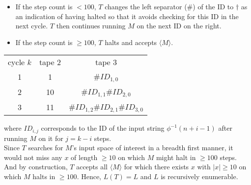 \documentclass[12pt]{article}
\begin{document}
\begin{itemize}
  \begin{itemize}
    \item If the step count is \(< 100\), \(T\) changes the left separator (\#) of the ID to \(\dagger\) as an indication of having halted so that it avoids checking for this ID in the next cycle. \(T\) then continues running \(M\) on the next ID on the right.
    \item If the step count is \(\geq 100\), \(T\) halts and accepts \(\langle M \rangle\).
  \end{itemize}
\end{itemize}

\begin{center}
  \begin{tabular}{ c c c }
  cycle \(k\) & tape 2 & tape 3 \\
  1 & 1 & \#\(ID_{1,0}\) \\
  2 & 10 & \#\(ID_{1,1}\)\#\(ID_{2,0}\)\\
  3 & 11 & \#\(ID_{1,2}\)\#\(ID_{2,1}\)\#\(ID_{3,0}\)\\
  \end{tabular}
\end{center}
where \(ID_{i,j}\) corresponds to the ID of the input string \(\phi^{-1}(n+i-1)\) after running \(M\) on it for \(j = k-i\) steps.\\
Since \(T\) searches for \(M\)'s input space of interest in a breadth first manner, it would not miss any \(x\) of length \(\geq 10\) on which \(M\) might halt in \(\geq 100\) steps. And by construction, \(T\) accepts all \(\langle M \rangle\) for which there exists \(x\) with \(|x| \geq 10\) on which \(M\) halts in \(\geq 100\). Hence, \(L(T) = L\) and \(L\) is recursively enumerable.
\end{document}
